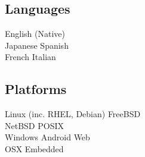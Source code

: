 \documentclass[11pt, a4paper]{cv}
\begin{document}
\begin{minipage}[t]{0.33\textwidth}
\sectionspace %

\subsection{Languages}
English (Native) \\\vspace{4pt}
Japanese \textbullet{} Spanish \\\vspace{4pt}
French \textbullet{} Italian

\sectionspace %

\subsection{Platforms}
Linux (inc. RHEL, Debian) \textbullet{} FreeBSD \\
NetBSD \textbullet{} POSIX \\\vspace{4pt}
Windows \textbullet{} Android \textbullet{} Web \\\vspace{4pt}
OSX \textbullet{} Embedded

\end{minipage} %
\hfill
%
%
\end{document}
